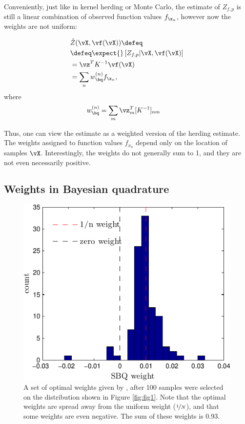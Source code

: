 Conveniently, just like in kernel herding or Monte Carlo, the estimate of $Z_{f,p}$ is still a linear combination of observed function values $f_{\x_n}$, however now the weights are not uniform:

\begin{align}
	&\hat{Z}(\vX,\vf(\vX)) \defeq \\
	&\defeq \expect{} \left[Z_{f,p} \vert \vX, \vf(\vX) \right]\\
	&= \vz^T K^{-1} \vf(\vX) \\
	&= \sum_n w_{\bq}^{(n)} f_{\x_n},
\end{align}  
where 
\begin{align}  
	w_{\bq}^{(n)} & = \sum_m \vz_m^T [K^{-1}]_{nm}
	\label{eq:bq_weights}
\end{align}

Thus, one can view the \bq{} estimate as a weighted version of the herding estimate. The weights assigned to function values $f_{x_n}$ depend only on the location of samples $\vX$. Interestingly, the weights do not generally sum to 1, and they are not even necessarily positive.

\subsection{Weights in Bayesian quadrature}

\begin{figure}[h]
	\centering
	\includegraphics[width=.8\columnwidth]{figs/herding/weights_v1_n100}
	\caption[Empirical distribution of weights in sequential Bayesian quadrature]{A set of optimal weights given by \bq{}, after 100 \sbq{} samples were selected on the distribution shown in Figure \ref{fig:fig1}. Note that the optimal weights are spread away from the uniform weight ($\nicefrac{1}{N}$), and that some weights are even negative. The sum of these weights is 0.93.}
	\label{fig:weights100}
\end{figure}

